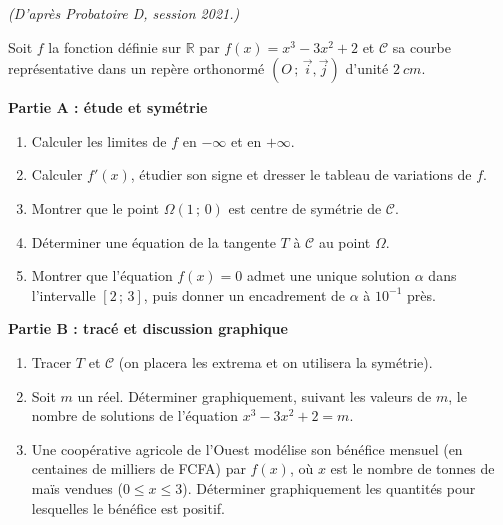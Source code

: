 \documentclass[11pt]{article}
\begin{document}
\begin{exercice}
\emph{(D'après Probatoire D, session 2021.)}

Soit $f$ la fonction définie sur $\mathbb{R}$ par $f(x)=x^3-3x^2+2$ et $\mathscr{C}$ sa courbe représentative dans un repère orthonormé $(O\,;\,\vec{i},\vec{j})$ d'unité $\SI{2}{cm}$.

\textbf{Partie A : étude et symétrie}
\begin{enumerate}
\item Calculer les limites de $f$ en $-\infty$ et en $+\infty$.
\item Calculer $f'(x)$, étudier son signe et dresser le tableau de variations de $f$.
\item Montrer que le point $\Omega(1\,;\,0)$ est centre de symétrie de $\mathscr{C}$.
\item Déterminer une équation de la tangente $T$ à $\mathscr{C}$ au point $\Omega$.
\item Montrer que l'équation $f(x)=0$ admet une unique solution $\alpha$ dans l'intervalle $[2\,;\,3]$, puis donner un encadrement de $\alpha$ à $10^{-1}$ près.
\end{enumerate}

\textbf{Partie B : tracé et discussion graphique}
\begin{enumerate}
\item Tracer $T$ et $\mathscr{C}$ (on placera les extrema et on utilisera la symétrie).
\item Soit $m$ un réel. Déterminer graphiquement, suivant les valeurs de $m$, le nombre de solutions de l'équation $x^3-3x^2+2=m$.
\item Une coopérative agricole de l'Ouest modélise son bénéfice mensuel (en centaines de milliers de FCFA) par $f(x)$, où $x$ est le nombre de tonnes de maïs vendues ($0\leq x\leq 3$). Déterminer graphiquement les quantités pour lesquelles le bénéfice est positif.
\end{enumerate}
\end{exercice}
\end{document}
